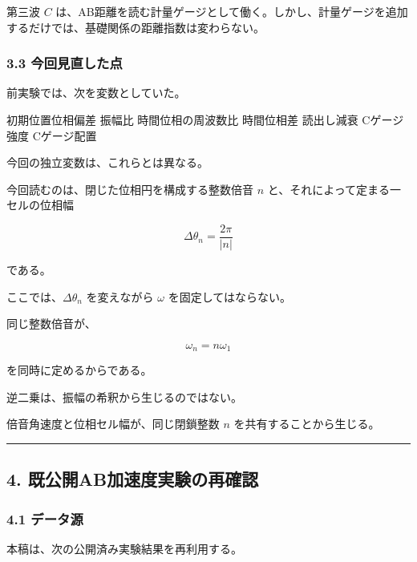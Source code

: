 \documentclass[
  a4paper,
]{ltjsarticle}
\newenvironment{Shaded}{}{}
\newcommand{\NormalTok}[1]{#1}
\begin{document}
第三波 \(C\)
は、AB距離を読む計量ゲージとして働く。しかし、計量ゲージを追加するだけでは、基礎関係の距離指数は変わらない。

\subsubsection{3.3
今回見直した点}\label{ux4ecaux56deux898bux76f4ux3057ux305fux70b9}

前実験では、次を変数としていた。

\begin{Shaded}
\begin{Highlighting}[]
\NormalTok{初期位置位相偏差}
\NormalTok{振幅比}
\NormalTok{時間位相の周波数比}
\NormalTok{時間位相差}
\NormalTok{読出し減衰}
\NormalTok{Cゲージ強度}
\NormalTok{Cゲージ配置}
\end{Highlighting}
\end{Shaded}

今回の独立変数は、これらとは異なる。

今回読むのは、閉じた位相円を構成する整数倍音 \(n\)
と、それによって定まる一セルの位相幅

\[
\Delta\theta_n=\frac{2\pi}{|n|}
\]

である。

ここでは、\(\Delta\theta_n\) を変えながら \(\omega\)
を固定してはならない。

同じ整数倍音が、

\[
\omega_n=n\omega_1
\]

を同時に定めるからである。

逆二乗は、振幅の希釈から生じるのではない。

倍音角速度と位相セル幅が、同じ閉鎖整数 \(n\) を共有することから生じる。

\begin{center}\rule{0.5\linewidth}{0.5pt}\end{center}

\subsection{4.
既公開AB加速度実験の再確認}\label{ux65e2ux516cux958babux52a0ux901fux5ea6ux5b9fux9a13ux306eux518dux78baux8a8d}

\subsubsection{4.1 データ源}\label{ux30c7ux30fcux30bfux6e90}

本稿は、次の公開済み実験結果を再利用する。
\end{document}

